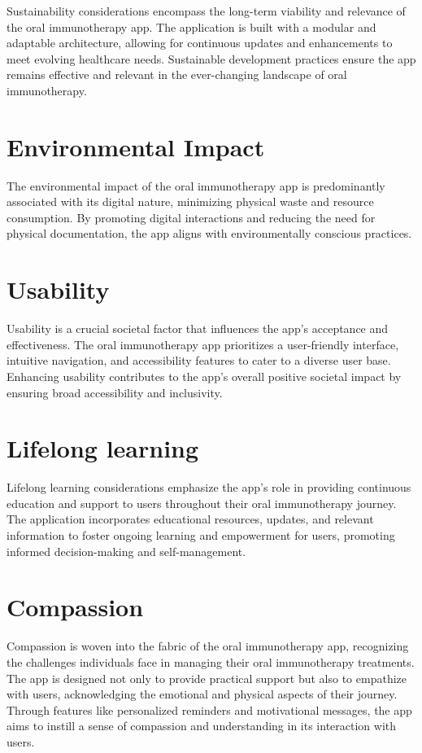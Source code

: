 Sustainability considerations encompass the long-term viability and relevance of the oral immunotherapy app. The application is built with a modular and adaptable architecture, allowing for continuous updates and enhancements to meet evolving healthcare needs. Sustainable development practices ensure the app remains effective and relevant in the ever-changing landscape of oral immunotherapy.

\section{Environmental Impact}

The environmental impact of the oral immunotherapy app is predominantly associated with its digital nature, minimizing physical waste and resource consumption. By promoting digital interactions and reducing the need for physical documentation, the app aligns with environmentally conscious practices.

\section{Usability}

Usability is a crucial societal factor that influences the app's acceptance and effectiveness. The oral immunotherapy app prioritizes a user-friendly interface, intuitive navigation, and accessibility features to cater to a diverse user base. Enhancing usability contributes to the app's overall positive societal impact by ensuring broad accessibility and inclusivity.

\section{Lifelong learning}

Lifelong learning considerations emphasize the app's role in providing continuous education and support to users throughout their oral immunotherapy journey. The application incorporates educational resources, updates, and relevant information to foster ongoing learning and empowerment for users, promoting informed decision-making and self-management.

\section{Compassion}

Compassion is woven into the fabric of the oral immunotherapy app, recognizing the challenges individuals face in managing their oral immunotherapy treatments. The app is designed not only to provide practical support but also to empathize with users, acknowledging the emotional and physical aspects of their journey. Through features like personalized reminders and motivational messages, the app aims to instill a sense of compassion and understanding in its interaction with users.